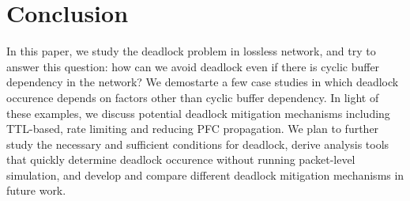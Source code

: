 \section{Conclusion}

In this paper, we study the deadlock problem in lossless network, and try to answer
this question: how can we avoid deadlock even if there is cyclic buffer dependency in
the network? We demostarte a few case studies in which deadlock occurence depends on
factors other than cyclic buffer dependency. In light of these examples, we discuss 
potential deadlock mitigation mechanisms including TTL-based, rate limiting and reducing
PFC propagation. We plan to further study the 
necessary and sufficient conditions for deadlock, derive analysis tools that quickly determine
deadlock occurence without running packet-level simulation, and develop and compare
different deadlock mitigation mechanisms in future work.


